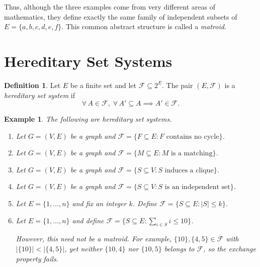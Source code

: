 \documentclass[11pt]{article}
\theoremstyle{plain}
\newtheorem{example}[theorem]{Example}
\theoremstyle{definition}
\newtheorem{definition}[theorem]{Definition}
\begin{document}
Thus, although the three examples come from very different areas of
mathematics, they define exactly the same family of independent subsets of
$E = \{a,b,c,d,e,f\}$.
This common abstract structure is called a \emph{matroid}.
 
\section{Hereditary Set Systems}
 
\begin{definition}
Let $E$ be a finite set and let $\mathcal{F} \subseteq 2^{E}$.
The pair $(E, \mathcal{F})$ is a \emph{hereditary set system} if
\[
  \forall\, A \in \mathcal{F},\; \forall\, A' \subseteq A
  \implies A' \in \mathcal{F}.
\]
\end{definition}
 
\begin{example}
The following are hereditary set systems.
\begin{enumerate}[leftmargin=*, itemsep=0.6ex]
 
\item Let $G = (V,E)$ be a graph and $\mathcal{F} = \{F \subseteq E : F
      \text{ contains no cycle}\}$.
 
\item Let $G = (V,E)$ be a graph and $\mathcal{F} = \{M \subseteq E : M
      \text{ is a matching}\}$.
 
\item Let $G = (V,E)$ be a graph and $\mathcal{F} = \{S \subseteq V : S
      \text{ induces a clique}\}$.
 
\item Let $G = (V,E)$ be a graph and $\mathcal{F} = \{S \subseteq V : S
      \text{ is an independent set}\}$.
 
\item Let $E = \{1,\dots,n\}$ and fix an integer $k$. Define
      $\mathcal{F} = \{S \subseteq E : |S| \le k\}$.
 
\item Let $E = \{1,\dots,n\}$ and define
      $\mathcal{F} = \bigl\{S \subseteq E : \sum_{i \in S} i \le 10\bigr\}$.
 
      However, this need not be a matroid.
      For example, $\{10\}, \{4,5\} \in \mathcal{F}$ with $|\{10\}| < |\{4,5\}|$,
      yet neither $\{10,4\}$ nor $\{10,5\}$ belongs to $\mathcal{F}$,
      so the exchange property fails.
 
\end{enumerate}
\end{example}
 
\end{document}

